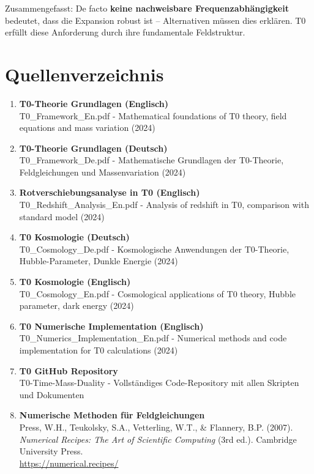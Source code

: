 	Zusammengefasst: De facto \textbf{keine nachweisbare Frequenzabhängigkeit} bedeutet, dass die Expansion robust ist – Alternativen müssen dies erklären. T0 erfüllt diese Anforderung durch ihre fundamentale Feldstruktur.
	
	\section{Quellenverzeichnis}
	
	\begin{enumerate}
		\item \textbf{T0-Theorie Grundlagen (Englisch)} \\
		T0\_Framework\_En.pdf - Mathematical foundations of T0 theory, field equations and mass variation (2024)
		
		\item \textbf{T0-Theorie Grundlagen (Deutsch)} \\
		T0\_Framework\_De.pdf - Mathematische Grundlagen der T0-Theorie, Feldgleichungen und Massenvariation (2024)
		
		\item \textbf{Rotverschiebungsanalyse in T0 (Englisch)} \\
		T0\_Redshift\_Analysis\_En.pdf - Analysis of redshift in T0, comparison with standard model (2024)
		
		\item \textbf{T0 Kosmologie (Deutsch)} \\
		T0\_Cosmology\_De.pdf - Kosmologische Anwendungen der T0-Theorie, Hubble-Parameter, Dunkle Energie (2024)
		
		\item \textbf{T0 Kosmologie (Englisch)} \\
		T0\_Cosmology\_En.pdf - Cosmological applications of T0 theory, Hubble parameter, dark energy (2024)
		
		\item \textbf{T0 Numerische Implementation (Englisch)} \\
		T0\_Numerics\_Implementation\_En.pdf - Numerical methods and code implementation for T0 calculations (2024)
		
		\item \textbf{T0 GitHub Repository} \\
		T0-Time-Mass-Duality - Vollständiges Code-Repository mit allen Skripten und Dokumenten
		
		\item \textbf{Numerische Methoden für Feldgleichungen} \\
		Press, W.H., Teukolsky, S.A., Vetterling, W.T., \& Flannery, B.P. (2007). \textit{Numerical Recipes: The Art of Scientific Computing} (3rd ed.). Cambridge University Press.\\
		\url{https://numerical.recipes/}
		

\end{enumerate}
